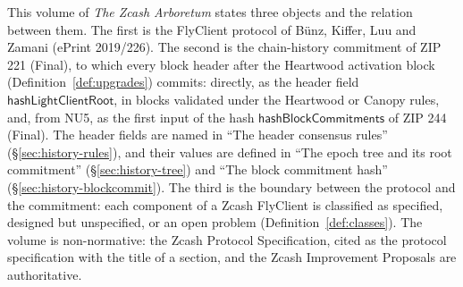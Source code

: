 \documentclass[11pt,a4paper]{article}
\theoremstyle{definition}
\begin{document}
This volume of \emph{The Zcash Arboretum} states three objects and the
relation between them. The first is the FlyClient protocol of B\"unz,
Kiffer, Luu and Zamani (ePrint 2019/226). The second is the chain-history
commitment of ZIP 221 (Final), to which every block header after the
Heartwood activation block (Definition~\ref{def:upgrades}) commits: directly,
as the header field $\mathsf{hashLightClientRoot}$, in blocks validated under
the Heartwood or Canopy rules, and, from NU5, as the first input of the hash
$\mathsf{hashBlockCommitments}$ of ZIP 244 (Final). The header fields are
named in ``The header consensus rules'' (\S\ref{sec:history-rules}), and
their values are defined in ``The epoch tree and its root commitment''
(\S\ref{sec:history-tree}) and ``The block commitment hash''
(\S\ref{sec:history-blockcommit}). The
third is the boundary between the protocol and the commitment: each
component of a Zcash FlyClient is classified as specified, designed but
unspecified, or an open problem (Definition~\ref{def:classes}). The volume is
non-normative: the Zcash Protocol Specification, cited as the protocol
specification with the title of a section, and the Zcash Improvement
Proposals are authoritative.
\end{document}
